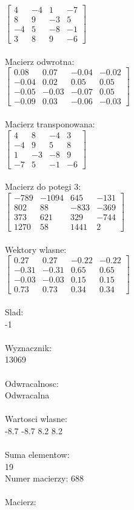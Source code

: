 \documentclass[a4paper,12pt]{article}
\begin{document}
$\begin{bmatrix} 4&-4&1&-7\\8&9&-3&5\\-4&5&-8&-1\\3&8&9&-6 \end{bmatrix}$
\\
\\
Macierz odwrotna:\\

$\begin{bmatrix} 0.08&0.07&-0.04&-0.02\\-0.04&0.02&0.05&0.05\\-0.05&-0.03&-0.07&0.05\\-0.09&0.03&-0.06&-0.03 \end{bmatrix}$
\\
\\
Macierz transponowana:\\

$\begin{bmatrix} 4&8&-4&3\\-4&9&5&8\\1&-3&-8&9\\-7&5&-1&-6 \end{bmatrix}$
\\
\\
Macierz do potegi 3:\\

$\begin{bmatrix} -789&-1094&645&-131\\802&88&-833&-369\\373&621&329&-744\\1270&58&1441&2 \end{bmatrix}$
\\
\\
Wektory wlasne:\\

$\begin{bmatrix} 0.27&0.27&-0.22&-0.22\\-0.31&-0.31&0.65&0.65\\-0.03&-0.03&0.15&0.15\\0.73&0.73&0.34&0.34 \end{bmatrix}$
\\
\\
Slad:\\
-1
\\
\\
Wyznacznik:\\
13069
\\
\\
Odwracalnosc:\\
Odwracalna
\\
\\
Wartosci wlasne:\\
-8.7 -8.7 8.2 8.2
\\
\\
Suma elementow:\\
19
\\
\newpage
Numer macierzy:
688
\\
\\
Macierz:\\
\end{document}
